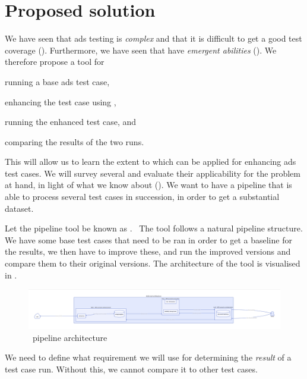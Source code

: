 \chapter{Proposed solution}\label{sec:solutionProposal}

We have seen that \acrshort{ads} testing is \textit{complex} and that it is difficult to get a good
test coverage (). Furthermore, we have seen that 
have \textit{emergent abilities} (). We therefore propose a tool for
\begin{inparaenum}
    \item running a base \acrshort{ads} test case,
    \item enhancing the test case using ,
    \item running the enhanced test case, and
    \item comparing the results of the two runs.
\end{inparaenum}

This will allow us to learn the extent to which  can be applied for enhancing
\acrlong{ads} test cases. We will survey several  and evaluate their applicability
for the problem at hand, in light of what we know about  (). We
want to have a pipeline that is able to process several test cases in succession, in order to get a
substantial dataset.

Let the pipeline tool be known as \hefe.~%
The tool follows a natural pipeline structure. We have some base test cases that
need to be ran in order to get a baseline for the results, we then have to
improve these, and run the improved versions and compare them to their original
versions. The architecture of the tool is visualised in .

\begin{figure}[h]
    \centering
    \includegraphics[width=\textwidth]{figures/d2-pdf/hefe.pdf}
    \caption{\hefe~pipeline architecture}\label{fig:hefeArch}
\end{figure}

We need to define what requirement we will use for determining the \textit{result} of a test case
run. Without this, we cannot compare it to other test cases.


